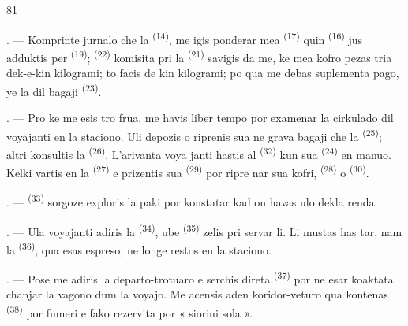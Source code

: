 \begin{VUpage}[83]{81}
\VUsaut{3.0mm}

. --- Komprinte jurnalo che la  \textsuperscript{(14)},\nl
me igis ponderar mea  \textsuperscript{(17)} quin \cc
{} \textsuperscript{(16)} jus adduktis per  \textsuperscript{(19)}; \nl
{} \textsuperscript{(22)} komisita pri la \cc
{} \textsuperscript{(21)} savigis da me, ke mea kofro pezas tria\cc
dek-e-kin kilogrami; to facis  de kin\nl
kilogrami; po qua me debas suplementa pago,\nl
ye la  dil bagaji \textsuperscript{(23)}.

. --- Pro ke me esis tro frua, me havis liber\cc
tempo por examenar la cirkulado dil voyajanti\nl
en la staciono. Uli depozis o riprenis sua ne\cc
grava bagaji che la  \textsuperscript{(25)}; altri\nl
konsultis la  \textsuperscript{(26)}. L'arivanta voya\cc
janti hastis al  \textsuperscript{(32)} kun sua  \textsuperscript{(24)} en\nl
manuo. Kelki vartis en la \cc
{} \textsuperscript{(27)} e prizentis sua  \textsuperscript{(29)} por ripre\cc
nar sua kofri,  \textsuperscript{(28)} o  \textsuperscript{(30)}.

. ---  \textsuperscript{(33)} sorgoze exploris\nl
la paki por konstatar kad on havas ulo dekla\cc
renda.

. --- Ula voyajanti adiris la  \textsuperscript{(34)}, ube\nl
{} \textsuperscript{(35)} zelis pri servar li. Li mustas has\cc
tar, nam la  \textsuperscript{(36)}, qua esas espreso, ne\nl
longe restos en la staciono.

. --- Pose me adiris la departo-trotuaro e\nl
serchis direta  \textsuperscript{(37)} por ne esar koaktata\nl
chanjar la vagono dum la voyajo. Me acensis\nl
aden koridor-veturo qua kontenas  \textsuperscript{(38)} por\nl
fumeri e fako rezervita por « siorini sola ».
\end{VUpage}

